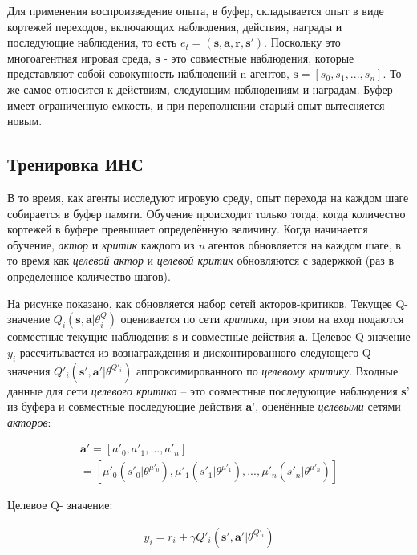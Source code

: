 Для применения воспроизведение опыта, в буфер, складывается опыт в виде кортежей переходов, включающих наблюдения, действия, награды и последующие наблюдения, то есть $e_t = (\mathbf{s, a, r, s'})$. Поскольку это многоагентная игровая среда, \textbf{s} - это совместные наблюдения, которые представляют собой совокупность наблюдений n агентов, $\mathbf{s} = [s_0, s_1, ..., s_n]$. То же самое относится к действиям, следующим наблюдениям и наградам. Буфер имеет ограниченную емкость, и при переполнении старый опыт вытесняется новым.

\subsection{Тренировка ИНС}

В то время, как агенты исследуют игровую среду, опыт перехода на каждом шаге собирается в буфер памяти. Обучение происходит только тогда, когда количество кортежей в буфере превышает определённую величину. Когда начинается обучение, \textit{актор} и \textit{критик} каждого из \textit{n} агентов обновляется на каждом шаге, в то время как \textit{целевой актор} и \textit{целевой критик} обновляются с задержкой (раз в определенное количество шагов).

На рисунке  показано, как обновляется набор сетей акторов-критиков. Текущее Q-значение $Q_i(\mathbf{s, a}|\theta ^Q_i)$ оценивается по сети \textit{критика}, при этом на вход подаются совместные текущие наблюдения \textbf{s} и совместные действия \textbf{a}. Целевое Q-значение $y_i$ рассчитывается из вознаграждения и дисконтированного следующего Q-значения $Q'_i(\mathbf{s', a'}|\theta ^{Q'_i})$ аппроксимированного по \textit{целевому критику}. Входные данные для сети \textit{целевого критика} – это совместные последующие наблюдения \textbf{s}' из буфера и совместные последующие действия \textbf{a}', оценённые \textit{целевыми} сетями \textit{акторов}:

\begin{equation}
    \begin{multlined}
        \mathbf{a'} = [a'_0, a'_1, ..., a'_n] \\
        = [\mu'_0(s'_0|\theta^{\mu'_0}), \mu'_1(s'_1|\theta^{\mu'_1}), ..., \mu'_n(s'_n|\theta^{\mu'_n})]
    \end{multlined}
\end{equation}

Целевое Q- значение:

\begin{equation}
    \begin{multlined}
        y_i = r_i + \gamma Q'_i(\mathbf{s', a'}|\theta^{Q'_i})
    \end{multlined}
\end{equation}


